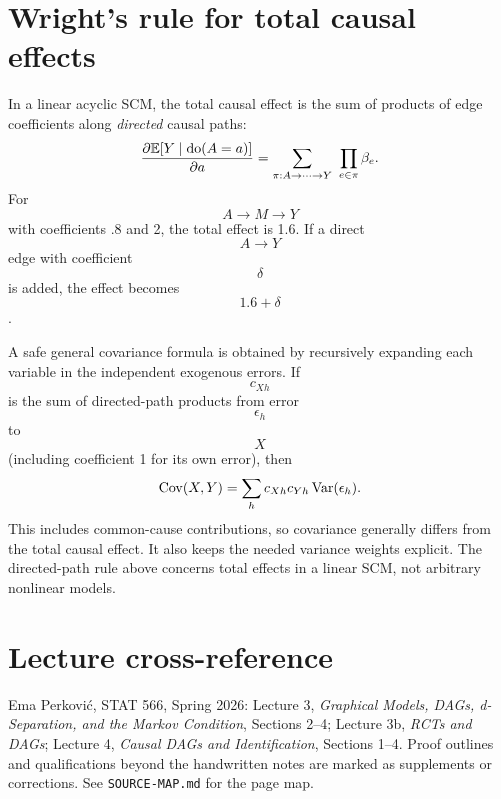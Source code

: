 \section{Wright's rule for total causal effects}
In a linear acyclic SCM, the total causal effect is the sum of products of edge coefficients along \emph{directed} causal paths:
\begin{equation}
\frac{\partial\mathbb E[Y\mid\operatorname{do}(A=a)]}{\partial a}
=\sum_{\pi:A\to\cdots\to Y}\ \prod_{e\in\pi}\beta_e.
\end{equation}
For $$A\to M\to Y$$ with coefficients .8 and 2, the total effect is 1.6. If a direct $$A\to Y$$ edge with coefficient $$\delta$$ is added, the effect becomes $$1.6+\delta$$.
\begin{supplement}
A safe general covariance formula is obtained by recursively expanding each variable in the independent exogenous errors. If $$c_{Xh}$$ is the sum of directed-path products from error $$\epsilon_h$$ to $$X$$ (including coefficient 1 for its own error), then
\begin{equation}
\operatorname{Cov}(X,Y)=\sum_h c_{Xh}c_{Yh}\operatorname{Var}(\epsilon_h).
\end{equation}
This includes common-cause contributions, so covariance generally differs from the total causal effect. It also keeps the needed variance weights explicit. The directed-path rule above concerns total effects in a linear SCM, not arbitrary nonlinear models.
\end{supplement}
\section*{Lecture cross-reference}
Ema Perkovi\'c, STAT 566, Spring 2026: Lecture 3, \emph{Graphical Models, DAGs, d-Separation, and the Markov Condition}, Sections 2--4; Lecture 3b, \emph{RCTs and DAGs}; Lecture 4, \emph{Causal DAGs and Identification}, Sections 1--4. Proof outlines and qualifications beyond the handwritten notes are marked as supplements or corrections. See \texttt{SOURCE-MAP.md} for the page map.
